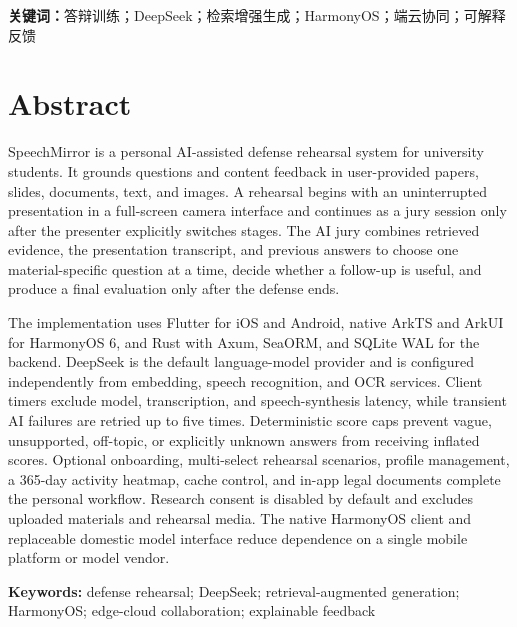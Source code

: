 \documentclass[UTF8,zihao=-4,openany,twoside]{ctexbook}
\begin{document}
\noindent\textbf{关键词：}答辩训练；DeepSeek；检索增强生成；HarmonyOS；端云协同；可解释反馈

\chapter*{Abstract}
SpeechMirror is a personal AI-assisted defense rehearsal system for university students. It grounds questions and content feedback in user-provided papers, slides, documents, text, and images. A rehearsal begins with an uninterrupted presentation in a full-screen camera interface and continues as a jury session only after the presenter explicitly switches stages. The AI jury combines retrieved evidence, the presentation transcript, and previous answers to choose one material-specific question at a time, decide whether a follow-up is useful, and produce a final evaluation only after the defense ends.

The implementation uses Flutter for iOS and Android, native ArkTS and ArkUI for HarmonyOS 6, and Rust with Axum, SeaORM, and SQLite WAL for the backend. DeepSeek is the default language-model provider and is configured independently from embedding, speech recognition, and OCR services. Client timers exclude model, transcription, and speech-synthesis latency, while transient AI failures are retried up to five times. Deterministic score caps prevent vague, unsupported, off-topic, or explicitly unknown answers from receiving inflated scores. Optional onboarding, multi-select rehearsal scenarios, profile management, a 365-day activity heatmap, cache control, and in-app legal documents complete the personal workflow. Research consent is disabled by default and excludes uploaded materials and rehearsal media. The native HarmonyOS client and replaceable domestic model interface reduce dependence on a single mobile platform or model vendor.

\noindent\textbf{Keywords:} defense rehearsal; DeepSeek; retrieval-augmented generation; HarmonyOS; edge-cloud collaboration; explainable feedback

\tableofcontents
\mainmatter

\printbibliography[heading=bibintoc,title={参考文献}]
\appendix

\end{document}
